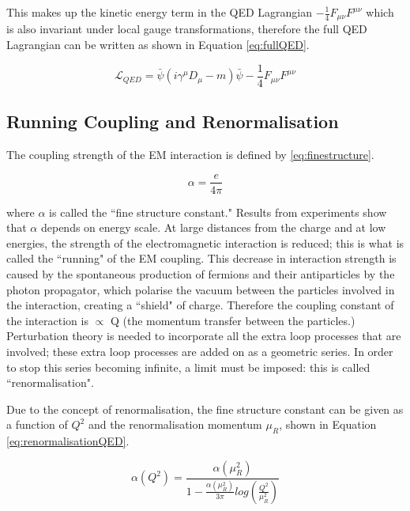 \documentclass[11pt,oneside,a4paper]{article}
\begin{document}
This makes up the kinetic energy term in the QED Lagrangian $-\frac{1}{4}F_{\mu\nu}F^{\mu\nu}$ which is also invariant under local gauge transformations, therefore the full QED Lagrangian can be written as shown in Equation \ref{eq:fullQED}.

\begin{equation}
\label{eq:fullQED}
\mathcal{L}_{QED} = \bar{\psi}(i\gamma^{\mu} D_{\mu}- m)\bar{\psi}-\frac{1}{4}F_{\mu\nu}F^{\mu\nu}
\end{equation}



\subsection{Running Coupling and Renormalisation}

The coupling strength of the EM interaction is defined by \ref{eq:finestructure}.

\begin{equation}
\label{eq:finestructure}
\alpha = \frac{e}{4\pi}
\end{equation}

where $\alpha$ is called the ``fine structure constant." Results from experiments show that $\alpha$ depends on energy scale. At large distances from the charge and at low energies, the strength of the electromagnetic interaction is reduced; this is what is called the ``running" of the EM coupling. This decrease in interaction strength is caused by the spontaneous production of fermions and their antiparticles by the photon propagator, which polarise the vacuum between the particles involved in the interaction, creating a ``shield" of charge. Therefore the coupling constant of the interaction is $\propto$ Q (the momentum transfer between the particles.) Perturbation theory is needed to incorporate all the extra loop processes that are involved; these extra loop processes are added on as a geometric series. In order to stop this series becoming infinite, a limit must be imposed: this is called ``renormalisation". 

Due to the concept of renormalisation, the fine structure constant can be given as a function of $Q^2$ and the renormalisation momentum $\mu_{R}$, shown in Equation \ref{eq:renormalisationQED}.

\begin{equation}
\label{eq:renormalisationQED}
\alpha(Q^{2}) = \frac{\alpha(\mu_{R}^{2})}{1-\frac{\alpha(\mu^{2}_{R})}{3\pi}log(\frac{Q^{2}}{\mu_{R}^{2}})}
\end{equation}
\end{document}
